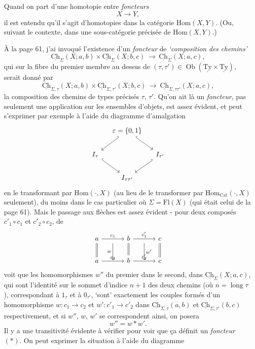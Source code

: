 \documentclass[11pt]{article}
\newcommand{\printedpage}[1]{\marginpar{\footnotesize p.~#1}}
\newcommand{\msp}[1]{\marginpar{\footnotesize [#1]}}
\newcommand{\Ch}{\underline{\mathrm{Ch}}}
\newcommand{\Ty}{\underline{\mathrm{Ty}}}
\newcommand{\Hom}{\mathrm{Hom}}
\begin{document}
Quand on part d'une homotopie entre \textit{foncteurs}
\[
X \longrightarrow Y,
\]
il est entendu qu'il s'agit d'homotopies dans la catégorie $\Hom(X,Y)$. (Ou, suivant le contexte, dans une sous-catégorie précisée de $\Hom(X,Y)$.)

\msp{page 77}
À la page 61, j'ai invoqué l'existence d'un \textit{foncteur} de \textit{`composition des chemins'}
\[
\Ch_{\Sigma}(X;a,b)\times\Ch_{\Sigma}(X;b,c) \ \longrightarrow\ \Ch_{\Sigma}(X;a,c),
\]
qui sur la fibre du premier membre au dessus de $(\tau,\tau') \in \operatorname{Ob}(\Ty\times\Ty)$, serait donné par
\[
\Ch_{\Sigma,\tau}(X;a,b)\times\Ch_{\Sigma,\tau'}(X;b,c) \ \longrightarrow\ \Ch_{\Sigma,\tau\tau'}(X;a,c), \tag*{$(*)$}
\]
la composition des chemins de types précisés $\tau$, $\tau'$. Qu'on ait là un \textit{foncteur,} pas seulement une application sur les ensembles d'objets, est assez évident, et peut s'exprimer par exemple à l'aide du diagramme d'amalgation
\[
\begin{tikzcd}[column sep=small]
 & \varepsilon = \{0,1\} \ar[dl,hook'] \ar[dr,hook] & \\
I_{\tau} \ar[dr,hook] & & I_{\tau'} \ar[dl,hook'] \\
 & I_{\tau\tau'} &
\end{tikzcd}
\]
en le transformant par $\Hom(\cdot,X)$ (au lieu de le transformer par $\mathrm{Hom}_{\mathrm{Cat}}(\cdot,X)$ seulement), du moins dans le cas particulier où $\Sigma = \mathrm{Fl}(X)$ (qui était celui de la page 61). Mais le passage aux flèches est assez évident - pour deux composés $c'_1\circ c_1$ et $c'_2\circ c_2$, de
\[
\begin{tikzcd}[column sep=small]
a \ar[rr,"c_1"] \ar[d,equal] & {} \ar[d,"w"'] & b \ar[rr,"c'_1"] \ar[d,equal] & {} \ar[d,"w'"] & c \ar[d,equal] \\
a \ar[rr,"c_2"] & {} & b \ar[rr,"c'_2"] & {} & c
\end{tikzcd}
\]
 voit que les homomorphismes $w''$ du premier dans le second, dans $\Ch_{\Sigma}(X;a,c)$, qui sont l'identité sur le sommet d'indice $n+1$ des deux chemins (où $n = \operatorname{long}\tau$), correspondant à $1_{\tau}$ et à $0_{\tau'}$, `sont' exactement les couples
\printedpage{51}
\msp{page 78}
formés d'un homomorphisme $w : c_1 \longrightarrow c_2$ et $w' : c'_1 \longrightarrow c'_2$ dans $\Ch_{\Sigma,\tau}(a,b)$ et $\Ch_{\Sigma,\tau'}(b,c)$ respectivement, et si $w''$, $w$, $w'$ se correspondent ainsi, on posera
\[
w'' = w * w'.
\]
Il y a une transitivité évidente à vérifier pour voir que ça définit un \textit{foncteur} $(*)$. On peut exprimer la situation à l'aide du diagramme
\end{document}

